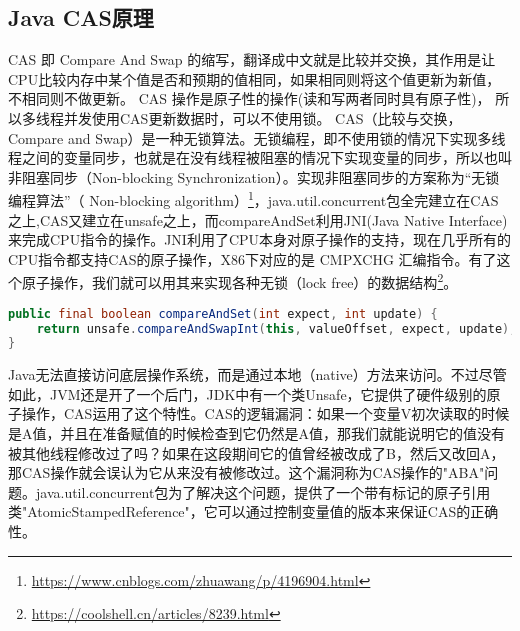\documentclass[../../../interview-questions.tex]{subfiles}
\begin{document}
\subsection{Java CAS原理}

CAS 即 Compare And Swap 的缩写，翻译成中文就是比较并交换，其作用是让CPU比较内存中某个值是否和预期的值相同，如果相同则将这个值更新为新值，不相同则不做更新。 CAS 操作是原子性的操作(读和写两者同时具有原子性)， 所以多线程并发使用CAS更新数据时，可以不使用锁。
CAS（比较与交换，Compare and Swap）是一种无锁算法。无锁编程，即不使用锁的情况下实现多线程之间的变量同步，也就是在没有线程被阻塞的情况下实现变量的同步，所以也叫非阻塞同步（Non-blocking Synchronization）。实现非阻塞同步的方案称为“无锁编程算法”（ Non-blocking algorithm）\footnote{\url{https://www.cnblogs.com/zhuawang/p/4196904.html}}，java.util.concurrent包全完建立在CAS之上,CAS又建立在unsafe之上，而compareAndSet利用JNI(Java Native Interface)来完成CPU指令的操作。JNI利用了CPU本身对原子操作的支持，现在几乎所有的CPU指令都支持CAS的原子操作，X86下对应的是 CMPXCHG 汇编指令。有了这个原子操作，我们就可以用其来实现各种无锁（lock free）的数据结构\footnote{\url{https://coolshell.cn/articles/8239.html}}。

\begin{lstlisting}[language=Java]
public final boolean compareAndSet(int expect, int update) {
    return unsafe.compareAndSwapInt(this, valueOffset, expect, update);
}
\end{lstlisting}

Java无法直接访问底层操作系统，而是通过本地（native）方法来访问。不过尽管如此，JVM还是开了一个后门，JDK中有一个类Unsafe，它提供了硬件级别的原子操作，CAS运用了这个特性。CAS的逻辑漏洞：如果一个变量V初次读取的时候是A值，并且在准备赋值的时候检查到它仍然是A值，那我们就能说明它的值没有被其他线程修改过了吗？如果在这段期间它的值曾经被改成了B，然后又改回A，那CAS操作就会误认为它从来没有被修改过。这个漏洞称为CAS操作的"ABA"问题。java.util.concurrent包为了解决这个问题，提供了一个带有标记的原子引用类"AtomicStampedReference"，它可以通过控制变量值的版本来保证CAS的正确性。
\end{document}
